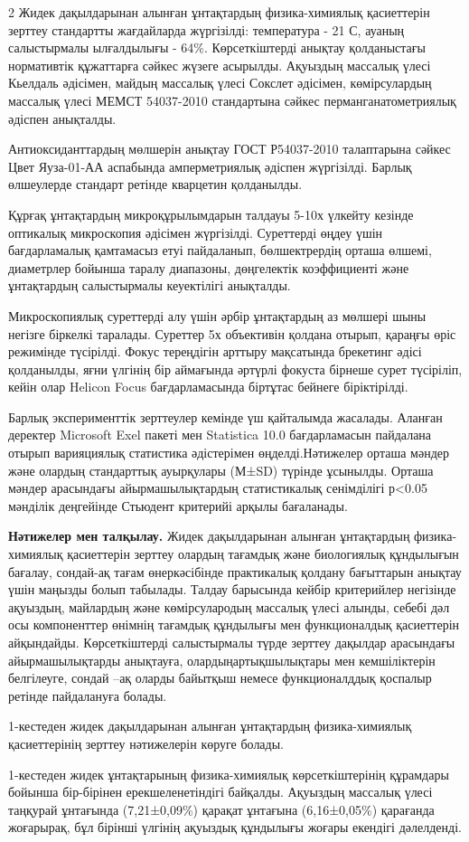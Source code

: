 \begin{multicols}{2}
Жидек дақылдарынан алынған ұнтақтардың физика-химиялық қасиеттерін
зерттеу стандартты жағдайларда жүргізілді: температура - 21
С, ауаның салыстырмалы ылғалдылығы - 64\%.
Көрсеткіштерді анықтау қолданыстағы нормативтік құжаттарға сәйкес жүзеге
асырылды. Ақуыздың массалық үлесі Кьелдаль әдісімен, майдың массалық
үлесі Сокслет әдісімен, көмірсулардың массалық үлесі МЕМСТ 54037-2010
стандартына сәйкес перманганатометриялық әдіспен анықталды.

Антиоксиданттардың мөлшерін анықтау ГОСТ Р54037-2010 талаптарына сәйкес
Цвет Яуза-01-АА аспабында амперметриялық әдіспен жүргізілді. Барлық
өлшеулерде стандарт ретінде кварцетин қолданылды.

Құрғақ ұнтақтардың микроқұрылымдарын талдауы 5-10х үлкейту кезінде
оптикалық микроскопия әдісімен жүргізілді. Суреттерді өңдеу үшін
бағдарламалық қамтамасыз етуі пайдаланып, бөлшектрердің орташа өлшемі,
диаметрлер бойынша таралу диапазоны, дөңгелектік коэффициенті және
ұнтақтардың салыстырмалы кеуектілігі анықталды.

Микроскопиялық суреттерді алу үшін әрбір ұнтақтардың аз мөлшері шыны
негізге біркелкі таралады. Суреттер 5х объективін қолдана отырып,
қараңғы өріс режимінде түсірілді. Фокус тереңдігін арттыру мақсатында
брекетинг әдісі қолданылды, яғни үлгінің бір аймағында әртүрлі фокуста
бірнеше сурет түсіріліп, кейін олар Helicon Focus бағдарламасында
біртұтас бейнеге біріктірілді.

Барлық эксперименттік зерттеулер кемінде үш қайталымда жасалады. Аланған
деректер Microsoft Exel пакеті мен Statistica 10.0 бағдарламасын
пайдалана отырып варияциялық статистика әдістерімен өңделді.Нәтижелер
орташа мәндер және олардың стандарттық ауырқулары (М±SD) түрінде
ұсынылды. Орташа мәндер арасындағы айырмашылықтардың статистикалық
сенімділігі р<0.05 мәнділік деңгейінде Стьюдент критерийі арқылы
бағаланады.

{\bfseries Нәтижелер мен талқылау.} Жидек дақылдарынан алынған ұнтақтардың
физика-химиялық қасиеттерін зерттеу олардың тағамдық және биологиялық
құндылығын бағалау, сондай-ақ тағам өнеркәсібінде практикалық қолдану
бағыттарын анықтау үшін маңызды болып табылады. Талдау барысында кейбір
критерийлер негізінде ақуыздың, майлардың және көмірсулародың массалық
үлесі алынды, себебі дәл осы компоненттер өнімнің тағамдық құндылығы мен
функционалдық қасиеттерін айқындайды. Көрсеткіштерді салыстырмалы түрде
зерттеу дақылдар арасындағы айырмашылықтарды анықтауға,
олардыңартықшылықтары мен кемшіліктерін белгілеуге, сондай --ақ оларды
байытқыш немесе функционалддық қоспалыр ретінде пайдалануға болады.

1-кестеден жидек дақылдарынан алынған ұнтақтардың физика-химиялық
қасиеттерінің зерттеу нәтижелерін көруге болады.

1-кестеден жидек ұнтақтарының физика-химиялық көрсеткіштерінің құрамдары
бойынша бір-бірінен ерекшеленетіндігі байқалды. Ақуыздың массалық үлесі
таңқурай ұнтағында (7,21±0,09\%) қарақат ұнтағына (6,16±0,05\%)
қарағанда жоғарырақ, бұл бірінші үлгінің ақуыздық құндылығы жоғары
екендігі дәлелденді.
\end{multicols}

